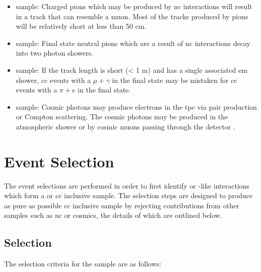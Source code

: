 \begin{itemize}
    \item \numu sample: Charged pions which may be produced by \gls{nc} interactions will result in a track that can resemble a muon. Most of the tracks produced by pions will be relatively short at less than 50 cm. 
    
    \item \nue sample: Final state neutral pions which are a result of \gls{nc} interactions decay into two photon showers. 
    \item \nue sample: If the track length is short (< 1 m) and has a single associated \gls{em} shower, \numu \gls{cc} events with a $\mu + \gamma$ in the final state may be mistaken for \nue \gls{cc} events with a $\pi + e$ in the final state.
    \item \nue sample: Cosmic photons may produce electrons in the \gls{tpc} via pair production or Compton scattering. The cosmic photons may be produced in the atmospheric shower or by cosmic muons passing through the detector \cite{SBN_Proposal}. 
\end{itemize}

\section{Event Selection}\label{sec:event_selection}


The event selections are performed in order to first identify \numu or \nue-like interactions which form a \numu or \nue \gls{cc} inclusive sample. The selection steps are designed to produce as pure as possible \gls{cc} inclusive sample by rejecting contributions from other samples such as \gls{nc} or cosmics, the details of which are outlined below. 

\subsection{\texorpdfstring{\numu Selection}{numu Selection}}\label{sec:numu_selection}

 The selection criteria for the \numu sample are as follows:

